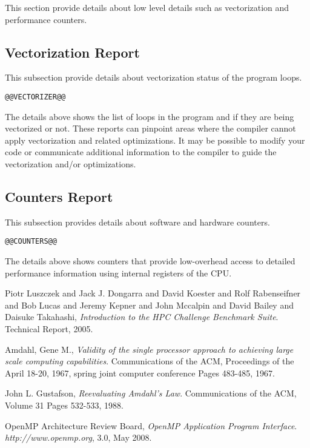 \documentclass[a4paper]{article}
\begin{document}
This section provide details about low level details such as vectorization and performance counters.

\subsection{Vectorization Report}

This subsection provide details about vectorization status of the program loops.

\begin{verbatim}
@@VECTORIZER@@
\end{verbatim}

The details above shows the list of loops in the program and if they are being vectorized or not.
These reports can pinpoint areas where the compiler cannot apply vectorization and related optimizations.
It may be possible to modify your code or communicate additional information to the compiler to guide the vectorization and/or optimizations.

\subsection{Counters Report}

This subsection provides details about software and hardware counters.

\begin{verbatim}
@@COUNTERS@@
\end{verbatim}

The details above shows counters that provide low-overhead access to detailed performance information using internal registers of the CPU.

\begin{thebibliography}{9}

  {Piotr Luszczek and Jack J. Dongarra and David Koester and Rolf Rabenseifner and Bob Lucas and Jeremy Kepner and John Mccalpin and David Bailey and Daisuke Takahashi},
  \emph{Introduction to the HPC Challenge Benchmark Suite}.
  Technical Report,
  2005.

  {Amdahl, Gene M.},
  \emph{Validity of the single processor approach to achieving large scale computing capabilities}.
  Communications of the ACM,
  {Proceedings of the April 18-20, 1967, spring joint computer conference Pages 483-485},
  1967.

  John L. Gustafson,
  \emph{Reevaluating Amdahl's Law}.
  Communications of the ACM,
  Volume 31 Pages 532-533,
  1988.

  OpenMP Architecture Review Board,
  \emph{OpenMP Application Program Interface}.
  {\it http://www.openmp.org},
  3.0,
  May 2008.

\end{thebibliography}
\end{document}
